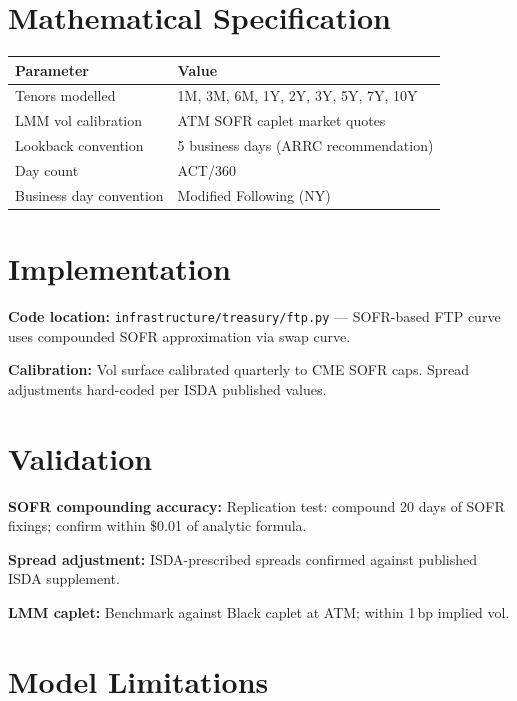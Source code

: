 \documentclass{apex_mdd}
\begin{document}
\section{Mathematical Specification}

\begin{center}
\small
\begin{tabular}{ll}
\toprule
\textbf{Parameter} & \textbf{Value} \\
\midrule
Tenors modelled          & 1M, 3M, 6M, 1Y, 2Y, 3Y, 5Y, 7Y, 10Y \\
LMM vol calibration      & ATM SOFR caplet market quotes \\
Lookback convention      & 5 business days (ARRC recommendation) \\
Day count                & ACT/360 \\
Business day convention  & Modified Following (NY) \\
\bottomrule
\end{tabular}
\end{center}

\section{Implementation}

\textbf{Code location:} \texttt{infrastructure/treasury/ftp.py} --- SOFR-based FTP curve uses compounded SOFR approximation via swap curve.

\textbf{Calibration:} Vol surface calibrated quarterly to CME SOFR caps. Spread adjustments hard-coded per ISDA published values.

\section{Validation}

\textbf{SOFR compounding accuracy:} Replication test: compound 20 days of SOFR fixings; confirm within \$0.01 of analytic formula.

\textbf{Spread adjustment:} ISDA-prescribed spreads confirmed against published ISDA supplement.

\textbf{LMM caplet:} Benchmark against Black caplet at ATM; within 1\,bp implied vol.

\section{Model Limitations}
\end{document}
